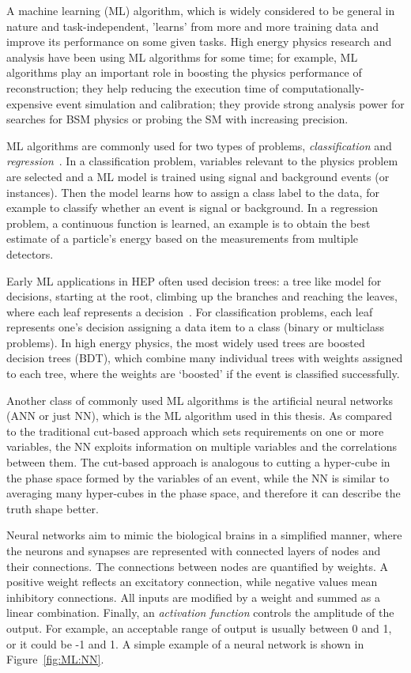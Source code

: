 \label{sec:ML}
A machine learning (ML) algorithm, which is widely considered to be 
general in nature and task-independent, 'learns' from more and more training data 
and improve its performance on some given tasks.
High energy physics research and analysis have been using ML algorithms for some time;
for example, ML algorithms play an
important role in boosting the physics performance of reconstruction;
they help reducing the execution time of computationally-expensive event simulation and calibration; 
they provide strong analysis power for searches for BSM physics or probing the SM
with increasing precision.

ML algorithms are commonly used for two types of problems, \textit{classification}
and \textit{regression}~\cite{ML-whitepaper}.
In a classification problem, variables relevant to the physics problem are selected 
and a ML model is trained using signal and background events (or instances). Then the model learns
how to assign a class label to the data, for example to classify whether an event is signal or background.
In a regression problem, a continuous function is learned, an example is to obtain the 
best estimate of a particle's energy based on the measurements from multiple detectors. 

Early ML applications in HEP often used decision trees: 
a tree like model for decisions, starting at the root, 
climbing up the branches and reaching the leaves,
where each leaf represents a decision~\cite{ML-review}. 
For classification problems, each leaf represents
one's decision assigning a data item to a class (binary or multiclass problems). 
In high energy physics, the most widely used trees are boosted decision trees (BDT), 
which combine many individual trees with weights assigned to each tree, where the weights
are `boosted' if the event is classified successfully.

Another class of commonly used ML algorithms is the 
artificial neural networks (ANN or just NN), which is the ML algorithm
used in this thesis. 
As compared to the traditional cut-based approach which sets requirements
on one or more variables, the NN exploits information on multiple variables and
the correlations between them.
The cut-based approach is analogous to cutting a hyper-cube in the phase space formed
by the variables of an event, while the NN is similar to averaging many hyper-cubes
in the phase space, and therefore it can describe the truth shape better.

Neural networks aim to mimic the biological brains in a simplified manner, 
where the neurons and synapses are represented with connected layers of
nodes and their connections. 
The connections between nodes are quantified by weights. 
A positive weight reflects an excitatory connection, 
while negative values mean inhibitory connections. 
All inputs are modified by a weight and summed as a linear combination.
Finally, an \textit{activation function} controls the amplitude of the output. 
For example, an acceptable range of output is usually between 0 and 1, 
or it could be -1 and 1. A simple example of a neural network is shown 
in Figure~\ref{fig:ML:NN}.

